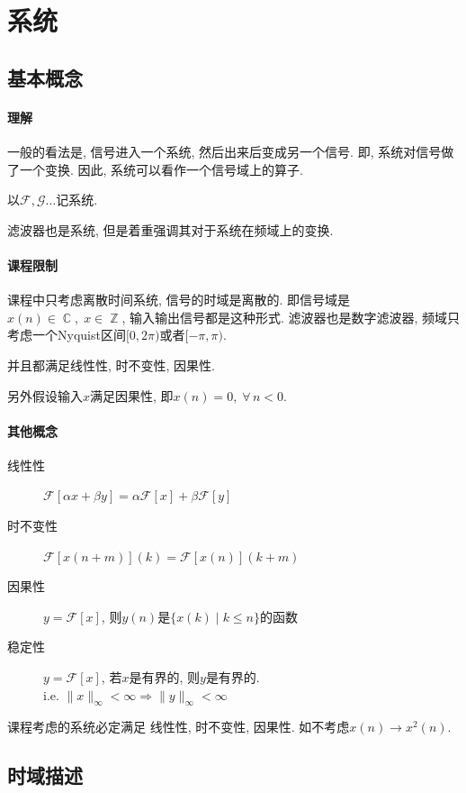 \documentclass{ctexart}
\DeclareMathOperator{\Cset}{\mathbb{C}}
\DeclareMathOperator{\Zset}{\mathbb{Z}}
\begin{document}
\section{系统}
\subsection{基本概念}
\paragraph{理解}
    一般的看法是, 信号进入一个系统, 然后出来后变成另一个信号. 即, 系统对信号做了一个变换.
    因此, 系统可以看作一个信号域上的算子.\par
    以$\mathcal{F}, \mathcal{G}\ldots$记系统.\par
    滤波器也是系统, 但是着重强调其对于系统在频域上的变换.
\paragraph{课程限制}
    课程中只考虑离散时间系统, 信号的时域是离散的.
    即信号域是$x(n) \in \Cset,\; x\in \Zset$, 输入输出信号都是这种形式.
    滤波器也是数字滤波器, 频域只考虑一个Nyquist区间$[0, 2\pi)$或者$[-\pi, \pi)$.\par
    并且都满足线性性, 时不变性, 因果性.\par
    另外假设输入$x$满足因果性, 即$x(n) = 0, \;\forall\, n < 0$.
\paragraph{其他概念}
    \begin{description}
        \item[线性性] $\mathcal{F}[\alpha x + \beta y] = \alpha \mathcal{F}[x] + \beta \mathcal{F}[y]$
        \item[时不变性] $\mathcal{F}[x(n + m)](k) = \mathcal{F}[x(n)](k + m)$
        \item[因果性] $y = \mathcal{F}[x]$, 则$y(n)$是$\{ x(k) \;|\; k \le n \}$的函数
        \item[稳定性] $y = \mathcal{F}[x]$, 若$x$是有界的, 则$y$是有界的.\\
                i.e. $\|x\|_{\infty} < \infty \Rightarrow \|y\|_{\infty} < \infty$
    \end{description}
    课程考虑的系统必定满足 线性性, 时不变性, 因果性. 如不考虑$x(n) \to x^2(n)$.

\subsection{时域描述}
\end{document}
